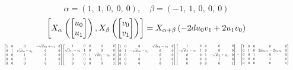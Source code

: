 \documentclass[11pt]{article}
\theoremstyle{definition}
\begin{document}
\[
\alpha = \left( 1, \  1, \  0, \  0, \  0\right), \quad \beta = \left( -1, \  1, \  0, \  0, \  0\right)
\]
\[
\scaletoalign{\textwidth}{\left[ X_{\alpha}\left(\left[\begin{matrix}u_{0}\\u_{1}\end{matrix}\right]\right), X_{\beta}\left(\left[\begin{matrix}v_{0}\\v_{1}\end{matrix}\right]\right) \right] = X_{\alpha + \beta}\left(- 2 d u_{0} v_{1} + 2 u_{1} v_{0}\right)}
\]
\[
\scaletoalign{\textwidth}{{\left[\begin{matrix}1 & 0 & 0 & - \sqrt{d} u_{0} + u_{1} & 0\\0 & 1 & \sqrt{d} u_{0} + u_{1} & 0 & 0\\0 & 0 & 1 & 0 & 0\\0 & 0 & 0 & 1 & 0\\0 & 0 & 0 & 0 & 1\end{matrix}\right]} {\left[\begin{matrix}1 & 0 & 0 & 0 & 0\\\sqrt{d} v_{1} + v_{0} & 1 & 0 & 0 & 0\\0 & 0 & 1 & \sqrt{d} v_{1} - v_{0} & 0\\0 & 0 & 0 & 1 & 0\\0 & 0 & 0 & 0 & 1\end{matrix}\right]} {\left[\begin{matrix}1 & 0 & 0 & \sqrt{d} u_{0} - u_{1} & 0\\0 & 1 & - \sqrt{d} u_{0} - u_{1} & 0 & 0\\0 & 0 & 1 & 0 & 0\\0 & 0 & 0 & 1 & 0\\0 & 0 & 0 & 0 & 1\end{matrix}\right]} {\left[\begin{matrix}1 & 0 & 0 & 0 & 0\\- \sqrt{d} v_{1} - v_{0} & 1 & 0 & 0 & 0\\0 & 0 & 1 & - \sqrt{d} v_{1} + v_{0} & 0\\0 & 0 & 0 & 1 & 0\\0 & 0 & 0 & 0 & 1\end{matrix}\right]} = {\left[\begin{matrix}1 & 0 & 0 & 0 & 0\\0 & 1 & 0 & 2 d u_{0} v_{1} - 2 u_{1} v_{0} & 0\\0 & 0 & 1 & 0 & 0\\0 & 0 & 0 & 1 & 0\\0 & 0 & 0 & 0 & 1\end{matrix}\right]}}
\]
\end{document}
